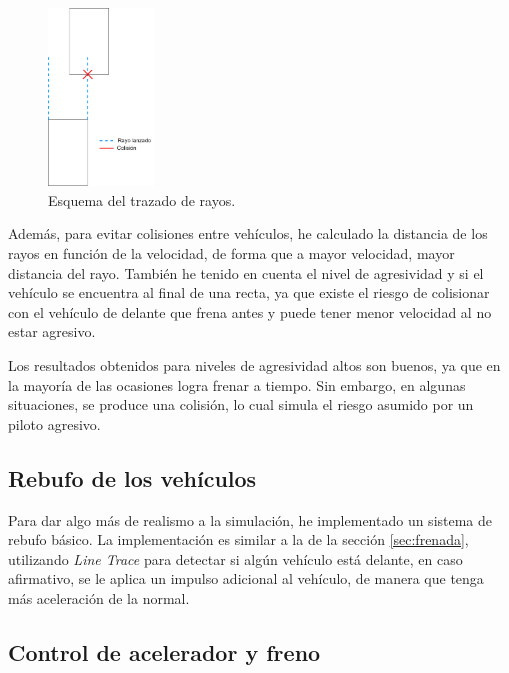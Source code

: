 \begin{figure}[H]
    \centering
    \includegraphics[width=0.25\textwidth]{imagenes/converted/raycast.jpg}
    \caption{Esquema del trazado de rayos.}
    \label{fig:esqlinetrace}
\end{figure}

\bigskip

Además, para evitar colisiones entre vehículos, he calculado la distancia de los rayos en función de la velocidad, de forma que a mayor velocidad, mayor distancia del rayo. También he tenido en cuenta el nivel de agresividad y si el vehículo se encuentra al final de una recta, ya que existe el riesgo de colisionar con el vehículo de delante que frena antes y puede tener menor velocidad al no estar agresivo.

\bigskip

Los resultados obtenidos para niveles de agresividad altos son buenos, ya que en la mayoría de las ocasiones logra frenar a tiempo. Sin embargo, en algunas situaciones, se produce una colisión, lo cual simula el riesgo asumido por un piloto agresivo.


\subsection{Rebufo de los vehículos}

Para dar algo más de realismo a la simulación, he implementado un sistema de rebufo básico. La implementación es similar a la de la sección \ref{sec:frenada}, utilizando \textit{Line Trace} para detectar si algún vehículo está delante, en caso afirmativo, se le aplica un impulso adicional al vehículo, de manera que tenga más aceleración de la normal.

\subsection{Control de acelerador y freno}

